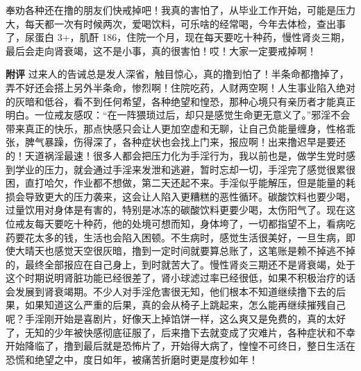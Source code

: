 \begin{case}
    奉劝各种还在撸的朋友们快戒掉吧！我真的害怕了，从毕业工作开始，可能是压力大，每天都一次有时候两次，爱喝饮料，可乐啥的经常喝，今年去体检，查出事了，尿蛋白 3+，肌酐 186，住院一个月，现在每天要吃十种药，慢性肾炎三期，最后会走向肾衰竭，这不是小事，真的很害怕！哎！大家一定要戒掉啊！

    \textbf{附评} 过来人的告诫总是发人深省，触目惊心，真的撸到怕了！半条命都撸掉了，弄不好还会搭上另外半条命，惨烈啊！住院吃药，人财两空啊！人生事业陷入绝对的灰暗和低谷，看不到任何希望，各种绝望和惶恐，那种心境只有亲历者才能真正明白。一位戒友感叹：“在一阵猥琐过后，却只是感觉生命更无意义了。”邪淫不会带来真正的快乐，那点快感只会让人更加空虚和无聊，让自己负能量缠身，性格乖张，脾气暴躁，伤得深了，各种症状也会找上门来，报应啊！出来撸迟早是要还的！天道祸淫最速！很多人都会把压力化为手淫行为，我以前也是，做学生党时感到学业的压力，就会通过手淫来发泄和逃避，暂时忘却一切，手淫完了感觉很累很困，直打哈欠，作业都不想做，第二天还起不来。手淫似乎能解压，但是能量的耗损会导致更大的压力袭来，这会让人陷入更糟糕的恶性循环。碳酸饮料也要少喝，过量饮用对身体是有害的，特别是冰冻的碳酸饮料更要少喝，太伤阳气了。现在这位戒友每天要吃十种药，他的处境可想而知，身体垮了，一切都指望不上，看病吃药要花太多的钱，生活也会陷入困顿。不生病时，感觉生活很美好，一旦生病，即使大晴天也感觉天空很灰暗，撸到一定时间就要算总账了，这笔账是赖不掉逃不掉的，最终全部报应在自己身上，到时就苦大了。慢性肾炎三期还不是肾衰竭，处于这个时期说明肾脏功能已经很差了，肾小球滤过率已经很低，如果不积极治疗的话会发展到肾衰竭期。不少人对手淫危害很无知，他们根本不知道继续撸下去的后果，如果知道这么严重的后果，真的会从椅子上跳起来，怎么能再继续摧残自己呢？手淫刚开始是喜剧片，好像天上掉馅饼一样，这么爽又是免费的，真的太好了，无知的少年被快感彻底征服了，后来撸下去就变成了灾难片，各种症状和不幸开始降临了，撸到最后就是恐怖片了，开始得大病了，惶惶不可终日，整日生活在恐慌和绝望之中，度日如年，被痛苦折磨时更是度秒如年！


\end{case}
